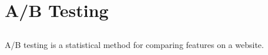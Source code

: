 \section{A/B Testing}
\label{sec:ab-testing}

\subsection{} A/B testing is a statistical method for comparing features on a website.

